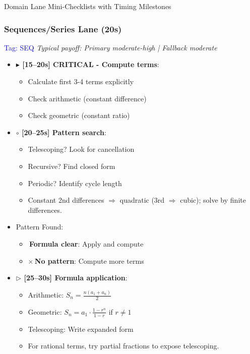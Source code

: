\documentclass{article}
\begin{document}
\begin{classifybox}{Domain Lane Mini-Checklists with Timing Milestones}
     \subsubsection{Sequences/Series Lane (20s)}
     {\footnotesize\textcolor{timegreen}{}}\quad\textcolor{blue}{Tag: SEQ}
      \textit{Typical payoff: Primary moderate-high | Fallback moderate}
      \begin{itemize}[nosep]
      \item \textbf{$\blacktriangleright$ [15--20s] CRITICAL - Compute terms}:
        \begin{itemize}[nosep]
        \item Calculate first 3-4 terms explicitly
        \item Check arithmetic (constant difference)
        \item Check geometric (constant ratio)
        \end{itemize}
      \item \textbf{$\circ$ [20--25s] Pattern search}:
        \begin{itemize}[nosep]
        \item Telescoping? Look for cancellation
        \item Recursive? Find closed form
        \item Periodic? Identify cycle length
        \item Constant 2nd differences $\Rightarrow$ quadratic (3rd $\Rightarrow$ cubic); solve by finite differences.
        \end{itemize}
      \item {} Pattern Found:
        \begin{itemize}[nosep]
        \item \checkmark\,\textbf{Formula clear}: Apply and compute
        \item $\times$\,\textbf{No pattern}: Compute more terms
        \end{itemize}
      \item \textbf{$\triangleright$ [25--30s] Formula application}:
        \begin{itemize}[nosep]
        \item Arithmetic: $S_n = \frac{n(a_1 + a_n)}{2}$
        \item Geometric: $S_n = a_1 \cdot \frac{1-r^n}{1-r}$ if $r \neq 1$
        \item Telescoping: Write expanded form
        \item For rational terms, try partial fractions to expose telescoping.

\end{itemize}
\end{itemize}
\end{classifybox}
\end{document}
